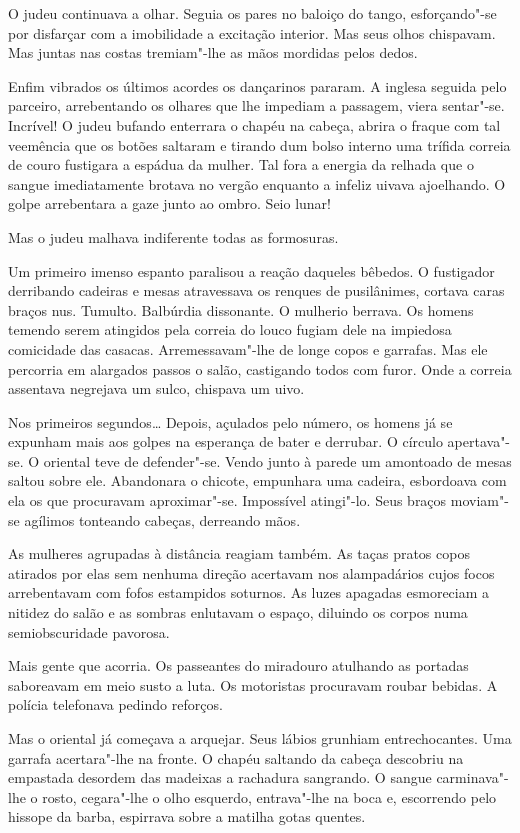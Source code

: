 O judeu continuava a olhar. Seguia os pares no baloiço do tango,
esforçando"-se por disfarçar com a imobilidade a excitação interior. Mas
seus olhos chispavam. Mas juntas nas costas tremiam"-lhe as mãos mordidas
pelos dedos.

Enfim vibrados os últimos acordes os dançarinos pararam. A inglesa
seguida pelo parceiro, arrebentando os olhares que lhe impediam a
passagem, viera sentar"-se. Incrível! O judeu bufando enterrara o chapéu
na cabeça, abrira o fraque com tal veemência que os botões saltaram e
tirando dum bolso interno uma trífida correia de couro fustigara a
espádua da mulher. Tal fora a energia da relhada que o sangue
imediatamente brotava no vergão enquanto a infeliz uivava ajoelhando. O
golpe arrebentara a gaze junto ao ombro. Seio lunar!

Mas o judeu malhava indiferente todas as formosuras.

Um primeiro imenso espanto paralisou a reação daqueles bêbedos. O
fustigador derribando cadeiras e mesas atravessava os renques de
pusilânimes, cortava caras braços nus. Tumulto. Balbúrdia dissonante. O
mulherio berrava. Os homens temendo serem atingidos pela correia do
louco fugiam dele na impiedosa comicidade das casacas. Arremessavam"-lhe
de longe copos e garrafas. Mas ele percorria em alargados passos o
salão, castigando todos com furor. Onde a correia assentava negrejava um
sulco, chispava um uivo.

Nos primeiros segundos\ldots{} Depois, açulados pelo número, os homens já se
expunham mais aos golpes na esperança de bater e derrubar. O círculo
apertava"-se. O oriental teve de defender"-se. Vendo junto à parede um
amontoado de mesas saltou sobre ele. Abandonara o chicote, empunhara uma
cadeira, esbordoava com ela os que procuravam aproximar"-se. Impossível
atingi"-lo. Seus braços moviam"-se agílimos tonteando cabeças, derreando
mãos.

As mulheres agrupadas à distância reagiam também. As taças pratos copos
atirados por elas sem nenhuma direção acertavam nos alampadários cujos
focos arrebentavam com fofos estampidos soturnos. As luzes apagadas
esmoreciam a nitidez do salão e as sombras enlutavam o espaço, diluindo
os corpos numa semiobscuridade pavorosa.

Mais gente que acorria. Os passeantes do miradouro atulhando as portadas
saboreavam em meio susto a luta. Os motoristas procuravam roubar
bebidas. A polícia telefonava pedindo reforços.

Mas o oriental já começava a arquejar. Seus lábios grunhiam
entrechocantes. Uma garrafa acertara"-lhe na fronte. O chapéu saltando da
cabeça descobriu na empastada desordem das madeixas a rachadura
sangrando. O sangue carminava"-lhe o rosto, cegara"-lhe o olho esquerdo,
entrava"-lhe na boca e, escorrendo pelo hissope da barba, espirrava sobre
a matilha gotas quentes.

